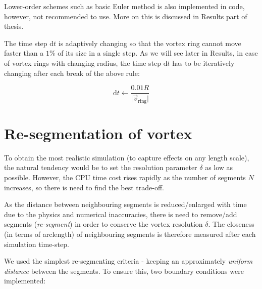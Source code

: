 Lower-order schemes such as basic Euler method is also implemented in code, however, not recommended to use. More on this is discussed in Results part of thesis.

The time step $\text{d}t$ is adaptively changing so that the vortex ring cannot move faster than a $1\%$ of its size in a single step. As we will see later in Results, in case of vortex rings with changing radius, the time step $\text{d}t$ has to be iteratively changing after each break of the above rule:

\begin{equation}
\text{d}t \leftarrow \frac{0.01 R}{\vert \vec{v}_{\text{ring}} \vert}
\label{adaptive_dt}
\end{equation}

\section{Re-segmentation of vortex}

To obtain the most realistic simulation (to capture effects on any length scale), the natural tendency would be to set the resolution parameter $\delta$ as low as possible. However, the CPU time cost rises rapidly as the number of segments $N$ increases, so there is need to find the best trade-off.

As the distance between neighbouring segments is reduced/enlarged with time due to the physics and numerical inaccuracies, there is need to remove/add segments (\textit{re-segment}) in order to conserve the vortex resolution $\delta$. The closeness (in terms of arclength) of neighbouring segments is therefore measured after each simulation time-step.

We used the simplest re-segmenting criteria - keeping an approximately \textit{uniform distance} between the segments. To ensure this, two boundary conditions were implemented:

